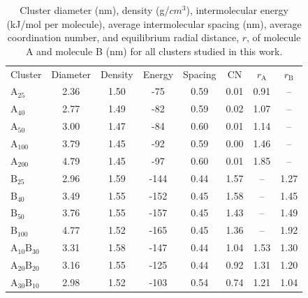 \begin{table}[ht]
\centering
\caption{Cluster diameter (nm), density (g/$cm^3$), intermolecular energy (kJ/mol per molecule), average intermolecular spacing (nm), average coordination number, and equilibrium radial distance, $r$, of molecule A and molecule B (nm) for all clusters studied in this work.} %
\label{table:maintable}
\begin{tabular}{lccccccc}
\hline
\multicolumn{1}{l}{\multirow{2}{*}{Cluster}} & \multicolumn{1}{c}{\multirow{2}{*}{Diameter}} & \multicolumn{1}{c}{\multirow{2}{*}{Density}} & \multicolumn{1}{c}{\multirow{2}{*}{Energy}} & \multicolumn{1}{c}{\multirow{2}{*}{Spacing}} &
\multicolumn{1}{c}{\multirow{2}{*}{CN}} &\multicolumn{1}{c}{\multirow{2}{*}{$r_{\text{A}}$}} & 
\multicolumn{1}{c}{\multirow{2}{*}{$r_{\text{B}}$}} \\ 
\multicolumn{1}{c}{} & \multicolumn{1}{c}{} & \multicolumn{1}{c}{} & \multicolumn{1}{c}{} & \multicolumn{1}{c}{} & \multicolumn{1}{c}{} & \multicolumn{1}{c}{} \\ \hline
$\text{A}_{\text{25}}$ & 2.36 & 1.50 & -75 & 0.59 & 0.01 &  0.91 & -- \\
$\text{A}_{\text{40}}$ & 2.77 & 1.49 & -82 & 0.59 & 0.02 & 1.07 & -- \\
$\text{A}_{\text{50}}$ & 3.00 & 1.47 & -84 & 0.60 & 0.01 & 1.14 & -- \\
$\text{A}_{\text{100}}$ & 3.79 & 1.45 & -92 & 0.59 & 0.00 & 1.46 & -- \\
$\text{A}_{\text{200}}$ & 4.79 & 1.45 & -97 & 0.60 & 0.01 & 1.85 & -- \\ \hline
$\text{B}_{\text{25}}$ & 2.96 & 1.59 & -144 & 0.44 & 1.57 & -- & 1.27 \\
$\text{B}_{\text{40}}$ & 3.49 & 1.55 & -152 & 0.45 & 1.58 & -- & 1.45 \\
$\text{B}_{\text{50}}$ & 3.76 & 1.55 & -157 & 0.45 & 1.43 & -- & 1.49 \\
$\text{B}_{\text{100}}$ & 4.77 & 1.52 & -165 & 0.45 & 1.36 & -- & 1.92 \\ \hline
$\text{A}_{\text{10}}\text{B}_{\text{30}}$ & 3.31 & 1.58 & -147 & 0.44 & 1.04 & 1.53 & 1.30 \\ 
$\text{A}_{\text{20}}\text{B}_{\text{20}}$ & 3.16 & 1.55 & -125 & 0.44 & 0.92 & 1.31 & 1.20 \\
$\text{A}_{\text{30}}\text{B}_{\text{10}}$ & 2.98 & 1.52 & -103 & 0.54 & 0.74 & 1.21 & 1.04 \\

\end{tabular}
\end{table}
